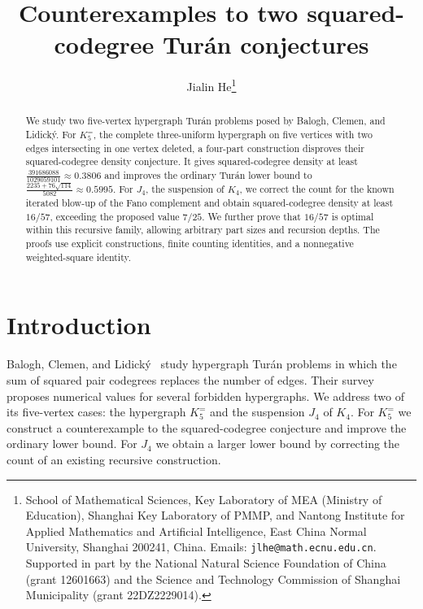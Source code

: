 \documentclass[11pt]{article}
\title{Counterexamples to two squared-codegree Tur\'an conjectures}
\author{Jialin He\thanks{School of Mathematical Sciences, Key Laboratory of MEA
 (Ministry of Education), Shanghai Key Laboratory of PMMP, and Nantong Institute
 for Applied Mathematics and Artificial Intelligence, East China Normal
 University, Shanghai 200241, China. Emails: \texttt{jlhe@math.ecnu.edu.cn}.
 Supported in part by the National Natural Science Foundation of China
 (grant 12601663) and the Science and Technology Commission of Shanghai
 Municipality (grant 22DZ2229014).}}
\date{}
\theoremstyle{remark}
\numberwithin{equation}{section}
\begin{document}
\maketitle

\begin{abstract}
We study two five-vertex hypergraph Tur\'an problems posed by Balogh,
Clemen, and Lidick\'y. For $K_5^{=}$, the complete three-uniform hypergraph
on five vertices with two edges intersecting in one vertex deleted,
a four-part construction disproves their squared-codegree density
conjecture. It gives squared-codegree density at least
$\frac{391686088}{1029059101}\approx0.3806$ and improves the ordinary
Tur\'an lower bound to $\frac{2235+76\sqrt{114}}{5082}\approx0.5995$.
For $J_4$, the suspension of $K_4$, we correct the count for the known
iterated blow-up of the Fano complement and obtain squared-codegree
density at least $16/57$, exceeding the proposed value $7/25$.
We further prove that $16/57$ is optimal within this recursive family,
allowing arbitrary part sizes and recursion depths. The proofs use
explicit constructions, finite counting identities, and a nonnegative
weighted-square identity.
\end{abstract}

\section{Introduction}

Balogh, Clemen, and Lidick\'y~\cite{BCLpublished,BCL} study hypergraph
Tur\'an problems in which the sum of squared pair codegrees replaces the
number of edges. Their survey proposes numerical values for several
forbidden hypergraphs. We address two of its five-vertex cases: the
hypergraph $K_5^{=}$ and the suspension $J_4$ of $K_4$. For $K_5^{=}$ we
construct a counterexample to the squared-codegree conjecture and improve
the ordinary lower bound. For $J_4$ we obtain a larger lower bound by
correcting the count of an existing recursive construction.
\end{document}
